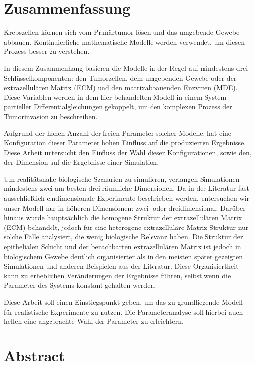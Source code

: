 \section*{Zusammenfassung}

Krebszellen können sich vom Primärtumor lösen und das umgebende Gewebe abbauen. 
Kontinuierliche mathematische Modelle werden verwendet, um diesen Prozess besser zu verstehen.

In diesem Zusammenhang basieren die Modelle in der Regel auf mindestens drei Schlüsselkomponenten: den Tumorzellen, dem umgebenden Gewebe oder der extrazellulären Matrix (ECM) und den matrixabbauenden Enzymen (MDE). Diese Variablen werden in dem hier behandelten Modell in einem System partieller Differentialgleichungen gekoppelt, um den komplexen Prozess der Tumorinvasion zu beschreiben.

Aufgrund der hohen Anzahl der freien Parameter solcher Modelle, hat eine Konfiguration dieser Parameter hohen Einfluss auf die produzierten Ergebnisse. Diese Arbeit untersucht den Einfluss der Wahl dieser Konfigurationen, sowie den, der Dimension auf die Ergebnisse einer Simulation.

Um realitätsnahe biologische Szenarien zu simulieren, verlangen Simulationen mindestens zwei am besten drei räumliche Dimensionen.
Da in der Literatur fast ausschließlich eindimensionale Experimente beschrieben werden, untersuchen wir unser Modell nur in höheren Dimensionen: zwei- oder dreidimensional. Darüber hinaus wurde hauptsächlich die homogene Struktur der extrazellulären Matrix (ECM) behandelt, jedoch für eine heterogene extrazelluläre Matrix Struktur nur solche Fälle analysiert, die wenig biologische Relevanz haben. Die Struktur der epithelialen Schicht und der benachbarten extrazellulären Matrix ist jedoch in biologischem Gewebe deutlich organisierter als in den meisten später gezeigten Simulationen und anderen Beispielen aus der Literatur. Diese Organisiertheit kann zu erheblichen Veränderungen der Ergebnisse führen, selbst wenn die Parameter des Systems konstant gehalten werden.

Diese Arbeit soll einen Einstiegspunkt geben, um das zu grundliegende Modell für realistische Experimente zu nutzen. Die Parameteranalyse soll hierbei auch helfen eine angebrachte Wahl der Parameter zu erleichtern.

\clearpage
\section*{Abstract}


